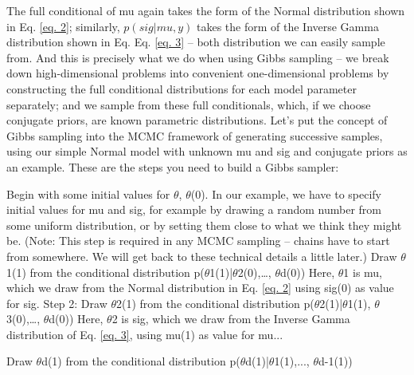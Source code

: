 The full conditional of mu again takes the form of the Normal distribution shown in Eq. \ref{eq. 2}; similarly, $p(sig|mu,y)$ takes the form of the Inverse Gamma distribution shown in Eq. Eq. \ref{eq. 3}  – both distribution we can easily sample from. And this is precisely what we do when using Gibbs sampling – we break down high-dimensional problems into convenient one-dimensional problems by constructing the full conditional distributions for each model parameter separately; and we sample from these full conditionals, which, if we choose conjugate priors, are known parametric distributions. 
Let's put the concept of Gibbs sampling into the MCMC framework of generating successive samples, using our simple Normal model with unknown mu and sig and conjugate priors as an example. These are the steps you need to build a Gibbs sampler:

{ Begin with some initial values for $\theta$, $\theta$(0).   }
In our example, we have to specify initial values for mu and sig, for example by drawing a random number from some uniform distribution, or by setting them close to what we think they might be. (Note: This step is required in any MCMC sampling – chains have to start from somewhere. We will get back to these technical details a little later.)
{ Draw $\theta$1(1) from the conditional distribution p($\theta$1(1)|$\theta$2(0),…, $\theta$d(0)) }
Here, $\theta$1 is mu, which we draw from the Normal distribution in Eq. \ref{eq. 2}  using sig(0) as value for sig.
{\flushleft Step 2: Draw $\theta$2(1) from the conditional distribution p($\theta$2(1)|$\theta$1(1), $\theta$3(0),…, $\theta$d(0)) }
Here, $\theta$2 is sig, which we draw from the Inverse Gamma
distribution of Eq. \ref{eq. 3}, using mu(1) as value for mu...

{ Draw $\theta$d(1) from the conditional distribution p($\theta$d(1)|$\theta$1(1),..., $\theta$d-1(1)) }

